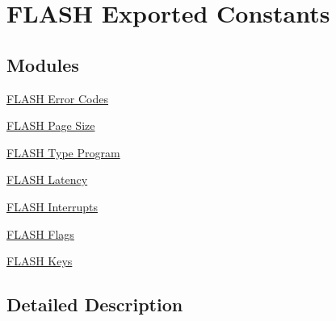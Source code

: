 \hypertarget{group___f_l_a_s_h___exported___constants}{\section{F\-L\-A\-S\-H Exported Constants}
\label{group___f_l_a_s_h___exported___constants}
}
\subsection*{Modules}
\begin{DoxyCompactItemize}
\item 
\hyperlink{group___f_l_a_s_h___error___codes}{F\-L\-A\-S\-H Error Codes}
\item 
\hyperlink{group___f_l_a_s_h___page___size}{F\-L\-A\-S\-H Page Size}
\item 
\hyperlink{group___f_l_a_s_h___type___program}{F\-L\-A\-S\-H Type Program}
\item 
\hyperlink{group___f_l_a_s_h___latency}{F\-L\-A\-S\-H Latency}
\item 
\hyperlink{group___f_l_a_s_h___interrupts}{F\-L\-A\-S\-H Interrupts}
\item 
\hyperlink{group___f_l_a_s_h___flags}{F\-L\-A\-S\-H Flags}
\item 
\hyperlink{group___f_l_a_s_h___keys}{F\-L\-A\-S\-H Keys}
\end{DoxyCompactItemize}


\subsection{Detailed Description}
